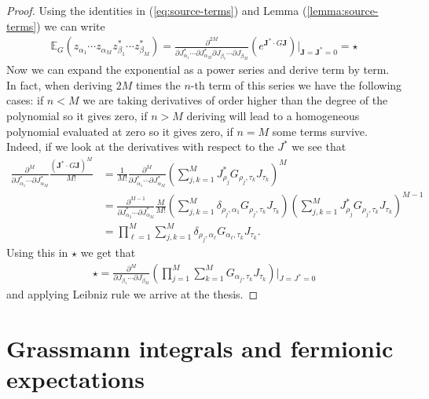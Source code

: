 \begin{proof}
	Using the identities in (\ref{eq:source-terms}) and Lemma (\ref{lemma:source-terms}) we
	can write
	\begin{align*}
		\mathbb{E}_G(z_{\alpha_1}\cdots z_{\alpha_M} z^*_{\beta_1}\cdots z^*_{\beta_M})
		= \frac{\partial^{2M}}{\partial J^*_{\alpha_1}\cdots\partial J^*_{\alpha_M}\partial J_{\beta_1}\cdots\partial J_{\beta_M}}
		\left(e^{\boldsymbol{J}^*\cdot G\boldsymbol{J}}\right)\bigg|_{\boldsymbol{J}=\boldsymbol{J}^*=0}
		= \star
	\end{align*}
	Now we can expand the exponential as a power series and derive term by term. In fact,
	when deriving $2M$ times the $n$-th term of this series we have the following cases: if
	$n<M$ we are taking derivatives of order higher than the degree of the polynomial so it
	gives zero, if $n>M$ deriving will lead to a homogeneous polynomial evaluated at zero so
	it gives zero, if $n=M$ some terms survive. Indeed, if we look at the derivatives with
	respect to the $J^*$ we see that
	\begin{align*}
		\frac{\partial^{M}}{\partial J^*_{\alpha_1}\cdots\partial J^*_{\alpha_M}}
		\frac{\left(\boldsymbol{J}^*\cdot G\boldsymbol{J}\right)^M}{M!}
		&= \frac{1}{M!}\frac{\partial^{M}}{\partial J^*_{\alpha_1}\cdots\partial J^*_{\alpha_M}}
		\left(\sum_{j,k=1}^M J^*_{\rho_j}G_{\rho_j,\tau_k}J_{\tau_k}\right)^M\\
		&= \frac{\partial^{M-1}}{\partial J^*_{\alpha_2}\cdots\partial J^*_{\alpha_M}}
		\frac{M}{M!}\left(\sum_{j,k=1}^M \delta_{\rho_j,\alpha_1}G_{\rho_j,\tau_k}J_{\tau_k}\right)
		\left(\sum_{j,k=1}^M J^*_{\rho_j}G_{\rho_j,\tau_k}J_{\tau_k}\right)^{M-1}\\
		&= \prod_{\ell=1}^M\sum_{j,k=1}^M\delta_{\rho_j,\alpha_\ell}G_{\alpha_\ell,\tau_k}J_{\tau_k}.
	\end{align*}
	Using this in $\star$ we get that
	\begin{align*}
		\star = \frac{\partial^M}{\partial J_{\beta_1}\cdots\partial J_{\beta_M}}
		\left(\prod_{j=1}^M\sum_{k=1}^MG_{\alpha_j,\tau_k}J_{\tau_k}\right)\Bigg|_{J=J^*=0}
	\end{align*}
	and applying Leibniz rule we arrive at the thesis.
\end{proof}

\section{Grassmann integrals and fermionic expectations}
\label{sec:grassmann}

